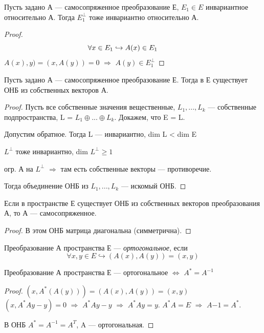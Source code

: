 \begin{theorem}
    Пусть задано А --- самосопряженное преобразование Е, $E_1 \in E$ инвариантное относительно А. Тогда $E_1^{\perp}$ тоже инвариантно относительно А.
\end{theorem}
\begin{proof}
    \[
    \forall x \in E_1 \hookrightarrow A(x) \in E_1 \hspace*{1cm}
    \]
    $A(x), y) = (x, A(y)) = 0$ $\Longrightarrow$ $A(y) \in E_1^{\perp}$
\end{proof}

\begin{theorem}
    Пусть задано А --- самосопряженное преобразование Е. Тогда в Е существует ОНБ из собственных векторов А.
\end{theorem}
\begin{proof}
    Пусть все собственные значения вещественные, $L_1, ..., L_k$ --- собственные подпространства, L = $L_1 \oplus ... \oplus L_k$. Докажем, что E = L.

    Допустим обратное. Тогда L --- инвариантно, dim L < dim E
    
    $L^\perp$ тоже инвариантно, dim $L^\perp \geq 1$

    огр. А на $L^\perp$ $\Longrightarrow$ там есть собственные векторы --- противоречие.

    Тогда объединение ОНБ из $L_1, ..., L_k$ --- искомый ОНБ.
\end{proof}

\begin{theorem} Если в пространстве Е существует ОНБ из собственных векторов преобразования А, то А --- самосопряженное.
    
\end{theorem}
\begin{proof}
    В этом ОНБ матрица диагональна (симметрична).
\end{proof}

\begin{definition}
    Преобразование А пространства Е --- \textit{ортогональное}, если
    \[
    \forall x, y \in E \hookrightarrow (A(x), A(y)) = (x, y)
    \]
\end{definition}

\begin{theorem}
    Преобразование А пространства Е --- ортогональное $\Longleftrightarrow$ $A^* = A^{-1}$
\end{theorem}
\begin{proof}
    $(x, A^*(A(y))) = (A(x), A(y)) = (x, y)$\\
    $(x, A^*Ay - y) = 0$ $\Longrightarrow$ $A^*Ay - y$ $\Longrightarrow$ $A^*Ay = y$. $A^*A = E$ $\Longrightarrow$ $A{-1} = A^*$.

    В ОНБ $A^* = A^{-1} = A^T$, A --- ортогональная.
\end{proof}

